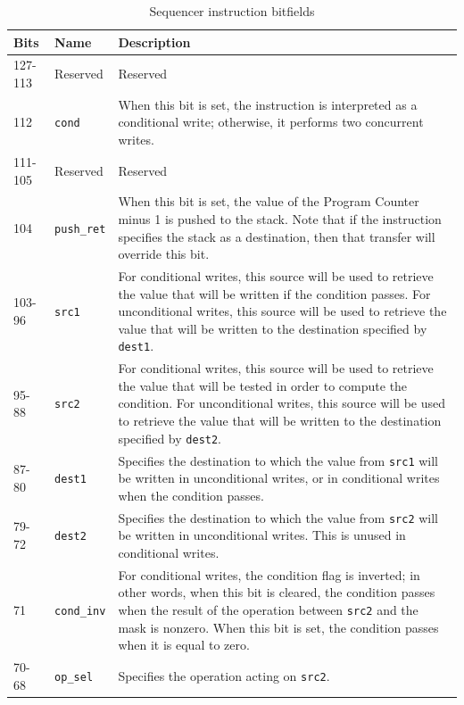 \begin{table}
  \centering
  \caption{Sequencer instruction bitfields}
  \label{tab_sequencer_instruction}
  \begin{tabular}{| m{1cm} | m{2.2cm} | m{8.5cm} |} 
    \hline
    \textbf{Bits} & \textbf{Name} & \textbf{Description} \\
    \hline
    127-113 & Reserved & Reserved \\
    \hline
    112 & \lstinline|cond| & When this bit is set, the instruction is interpreted as a conditional write; otherwise, it performs two concurrent writes. \\
    \hline
    111-105 & Reserved & Reserved \\
    \hline
    104 & \lstinline|push_ret| & When this bit is set, the value of the Program Counter minus 1 is pushed to the stack. Note that if the instruction specifies the stack as a destination, then that transfer will override this bit. \\
    \hline
    103-96 & \lstinline|src1| & For conditional writes, this source will be used to retrieve the value that will be written if the condition passes. For unconditional writes, this source will be used to retrieve the value that will be written to the destination specified by \lstinline|dest1|. \\
    \hline
    95-88 & \lstinline|src2| & For conditional writes, this source will be used to retrieve the value that will be tested in order to compute the condition. For unconditional writes, this source will be used to retrieve the value that will be written to the destination specified by \lstinline|dest2|. \\
    \hline
    87-80 & \lstinline|dest1| & Specifies the destination to which the value from \lstinline|src1| will be written in unconditional writes, or in conditional writes when the condition passes. \\
    \hline
    79-72 & \lstinline|dest2| & Specifies the destination to which the value from \lstinline|src2| will be written in unconditional writes. This is unused in conditional writes. \\
    \hline
    71 & \lstinline|cond_inv| & For conditional writes, the condition flag is inverted; in other words, when this bit is cleared, the condition passes when the result of the operation between \lstinline|src2| and the mask is nonzero. When this bit is set, the condition passes when it is equal to zero. \\
    \hline
    70-68 & \lstinline|op_sel| & Specifies the operation acting on \lstinline|src2|. \\

\end{tabular}
\end{table}
